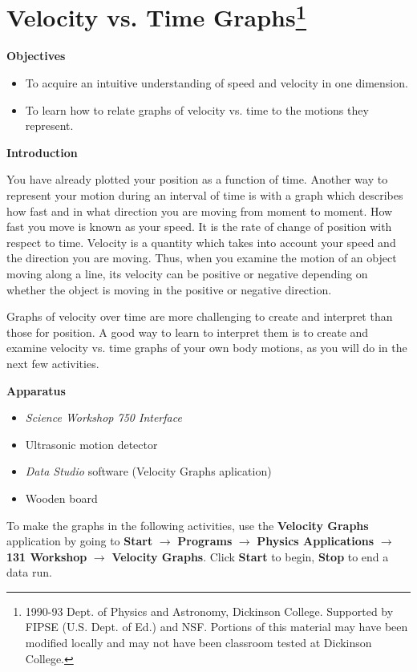 
\section{Velocity vs. Time Graphs\footnote{
1990-93 Dept. of Physics and Astronomy, Dickinson College. Supported by FIPSE
(U.S. Dept. of Ed.) and NSF. Portions of this material may have been modified
locally and may not have been classroom tested at Dickinson College.
}}

\makelabheader %

\textbf{Objectives }

\begin{itemize}
\item To acquire an intuitive understanding of speed and velocity in one dimension. 
\item To learn how to relate graphs of velocity vs. time to the motions they represent.
\end{itemize}
\textbf{Introduction} 

You have already plotted your position as a function of time. Another way to
represent your motion during an interval of time is with a graph which describes
how fast and in what direction you are moving from moment to moment. How fast
you move is known as your speed. It is the rate of change of position with respect
to time. Velocity is a quantity which takes into account your speed and the
direction you are moving. Thus, when you examine the motion of an object moving
along a line, its velocity can be positive or negative depending
on whether the object is moving in the positive or negative direction.

Graphs of velocity over time are more challenging to create and interpret than
those for position. A good way to learn to interpret them is to create and examine velocity vs. time graphs of your own body motions, as you will do in the next few activities.

\textbf{Apparatus}

\begin{itemize}
\item \textit{Science Workshop 750 Interface}
\item Ultrasonic motion detector
\item \textit{Data Studio} software (Velocity Graphs aplication)
\item Wooden board
\end{itemize}

To make the graphs in the following activities, use the \textbf{Velocity Graphs} application by going to \textbf{Start} $\rightarrow$ \textbf{Programs} $\rightarrow$ \textbf{Physics Applications} $\rightarrow$ \textbf{131 Workshop} $\rightarrow$ \textbf{Velocity Graphs}. Click \textbf{Start} to begin, \textbf{Stop} to end a data run.

